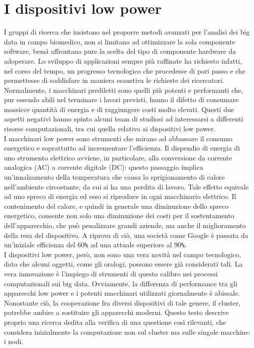 \section{I dispositivi low power}
I gruppi di ricerca che insistono nel proporre metodi avanzati per l'analisi dei big data in campo biomedico, non si limitano ad ottimizzare la sola componente software, bensì affrontano pure la scelta del tipo di componente hardware da adoperare. Lo sviluppo di applicazioni sempre più raffinate ha richiesto infatti, nel corso del tempo, un progresso tecnologico che procedesse di pari passo e che permettesse di soddisfare in maniera esaustiva le richieste dei ricercatori. Normalmente, i macchinari prediletti sono quelli più potenti e performanti che, pur essendo abili nel terminare i lavori previsti, hanno il difetto di consumare massicce quantità di energia e di raggiungere costi molto elevati. Questi due aspetti negativi hanno spinto alcuni team di studiosi ad interessarsi a differenti risorse computazionali, tra cui quella relativa ai dispositivi low power.\\
I macchinari low power sono strumenti che mirano ad abbassare il consumo energetico e soprattutto ad incrementare l'efficienza. Il dispendio di energia di uno strumento elettrico avviene, in particolare, alla conversione da corrente analogica (AC) a corrente digitale (DC): questo passaggio implica un'innalzamento della temperatura che causa lo sprigionamento di calore nell'ambiente circostante, da cui si ha una perdita di lavoro. Tale effetto equivale ad uno spreco di energia ed esso si riproduce in ogni macchinario elettrico. Il contenimento del calore, e quindi in generale una diminuzione dello spreco energetico, consente non solo una diminuzione dei costi per il sostentamento dell'apparecchio, che può penalizzare grandi aziende, ma anche il miglioramento della resa del dispositivo. A riprova di ciò, una società come Google è passata da un'iniziale efficienza del 60\verb!%! ad una attuale superiore al 90\verb!%!.\\
I dispositivi low power, però, non sono una vera novità nel campo tecnologico, dato che alcuni oggetti, come gli orologi, possono essere già considerati tali. La vera innovazione è l'impiego di strumenti di questo calibro nei processi computazionali sui big data. Ovviamente, la differenza di performance tra gli apparecchi low power e i potenti macchinari utilizzati giornalmente è abissale. Nonostante ciò, la cooperazione fra diversi dispositivi di tale genere, il cluster, potrebbe ambire a sostituire gli apparecchi moderni. Questo testo descrive proprio una ricerca dedita alla verifica di una questione così rilevanti, che considera inizialmente la computazione non sul cluster ma sulle singole macchine: i nodi.\\

